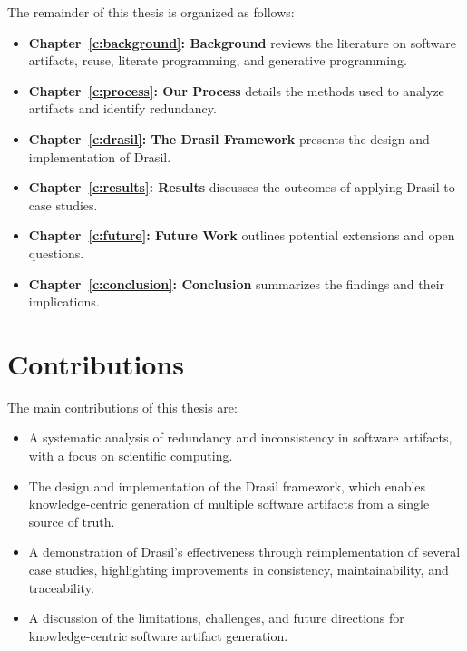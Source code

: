 The remainder of this thesis is organized as follows:
\begin{itemize}
    \item \textbf{Chapter~\ref{c:background}: Background} reviews the 
    literature on software artifacts, reuse, literate programming, and 
    generative programming.
    \item \textbf{Chapter~\ref{c:process}: Our Process} details the methods 
    used to analyze artifacts and identify redundancy.
    \item \textbf{Chapter~\ref{c:drasil}: The Drasil Framework} presents the 
    design and implementation of Drasil.
    \item \textbf{Chapter~\ref{c:results}: Results} discusses the outcomes of 
    applying Drasil to case studies.
    \item \textbf{Chapter~\ref{c:future}: Future Work} outlines potential 
    extensions and open questions.
    \item \textbf{Chapter~\ref{c:conclusion}: Conclusion} summarizes the 
    findings and their implications.
\end{itemize}

\section{Contributions}

The main contributions of this thesis are:
\begin{itemize}
    \item A systematic analysis of redundancy and inconsistency in software 
    artifacts, with a focus on scientific computing.
    \item The design and implementation of the Drasil framework, which enables 
    knowledge-centric generation of multiple software artifacts from a single 
    source of truth.
    \item A demonstration of Drasil's effectiveness through reimplementation of 
    several case studies, highlighting improvements in consistency, 
    maintainability, and traceability.
    \item A discussion of the limitations, challenges, and future directions 
    for knowledge-centric software artifact generation.
\end{itemize}


